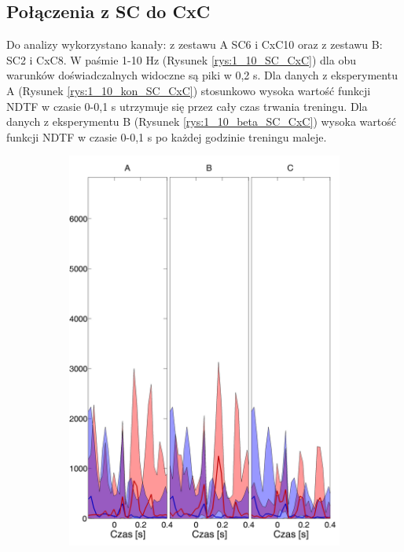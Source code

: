 \documentclass{pracamgr}
\begin{document}
	\subsection{Połączenia z SC do CxC}
	Do analizy wykorzystano kanały: z zestawu A SC6 i CxC10 oraz z zestawu B: SC2 i CxC8.
	W paśmie 1-10 Hz (Rysunek \ref{rys:1_10_SC_CxC}) dla obu warunków doświadczalnych widoczne są piki w 0,2 s. Dla danych z eksperymentu A (Rysunek \ref{rys:1_10_kon_SC_CxC}) stosunkowo wysoka wartość funkcji NDTF w czasie 0-0,1 s utrzymuje się przez cały czas trwania treningu. Dla danych z eksperymentu B (Rysunek \ref{rys:1_10_beta_SC_CxC}) wysoka wartość funkcji NDTF w czasie 0-0,1 s po każdej godzinie treningu maleje.
	\begin{figure}[h]
		\begin{subfigure}{.5\textwidth}
			\centering
			\includegraphics[width=1.\linewidth]{kontrola15_1-10_z_SC6_do_CxC102.png}

\end{subfigure}
\end{figure}
\end{document}
